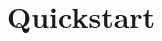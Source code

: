 \documentclass[Orbiter User Manual.tex]{subfiles}
\begin{document}
\section{Quickstart}

\end{document}
